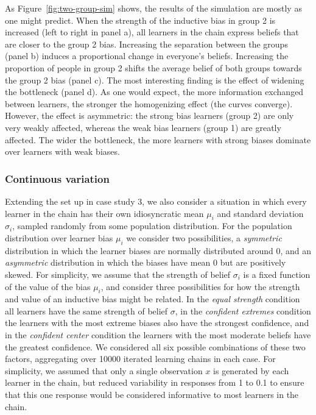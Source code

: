 \documentclass[doc]{apa6}
\begin{document}
As Figure~\ref{fig:two-group-sim} shows, the results of the simulation are mostly as one might predict. When the strength of the inductive bias in group 2 is increased (left to right in panel a), all learners in the chain express beliefs that are closer to the group 2 bias. Increasing the separation between the groups (panel b) induces a proportional change in everyone's beliefs. Increasing the proportion of people in group 2 shifts the average belief of both groups towards the group 2 bias (panel c). The most interesting finding is the effect of widening the bottleneck (panel d). As one would expect, the more information exchanged between learners, the stronger the homogenizing effect (the curves converge). However, the effect is asymmetric: the strong bias learners (group 2) are only very weakly affected, whereas the weak bias learners (group 1) are greatly affected. The wider the bottleneck, the more learners with strong biases dominate over learners with weak biases.



\smallskip
\subsubsection{Continuous variation} Extending the set up in case study 3, we also consider a situation in which every learner in the chain has their own idiosyncratic mean $\mu_i$ and standard deviation $\sigma_i$, sampled randomly from some population distribution. For the population distribution over learner bias $\mu_i$ we consider two possibilities, a {\it symmetric} distribution in which the learner biases are normally distributed around 0, and an {\it asymmetric} distribution in which the biases have mean 0 but are positively skewed. For simplicity, we assume that the strength of belief $\sigma_i$ is a fixed function of the value of the bias $\mu_i$, and consider three possibilities for how the strength and value of an inductive bias might be related. In the {\it equal strength} condition all learners have the same strength of belief $\sigma$, in the {\it confident extremes} condition the learners with the most extreme biases also have the strongest confidence, and in the {\it confident center} condition the learners with the most moderate beliefs have the greatest confidence. We considered all six possible combinations of these two factors, aggregating over 10000 iterated learning chains in each case. For simplicity, we assumed that only a single observation $x$ is generated by each learner in the chain, but reduced variability in responses from 1 to 0.1 to ensure that this one response would be considered informative to most learners in the chain.
\end{document}
